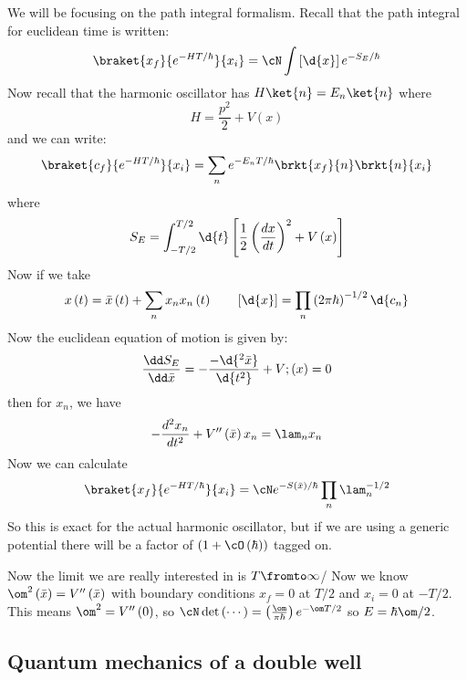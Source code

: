 \documentclass{booc}
\begin{document}
We will be focusing on the path integral formalism.
Recall that the path integral for euclidean time is written:
\begin{equation}
\braket{x_f}{e^{-HT /\hbar}}{x_i} = 
\cN \int \left[ \d{x} \right] e^{-S_E / \hbar}
\end{equation}
Now recall that the harmonic oscillator has
$H\ket {n} = E_n\ket{n}$ 
where
\begin{equation}
H = \frac{p^2}{2} + V\left( x \right) 
\end{equation}
and we can write:
\begin{equation}
\braket{c_f}{e^{-HT / \hbar}}{x_i} = \sum_n e^{-E_n T / \hbar} \brkt{x_f}{n} \brkt{n}{x_i}
\end{equation}
where
\begin{equation}
S_E = \int_{-T/2}^{T/2} \d{t} \left[ \frac{1}{2} \left( \frac{dx}{dt} \right)^2 + V\left( x \right) \right]
\end{equation}
Now if we take
\begin{equation}
x\left( t \right) = \bar x\left( t \right) + \sum_n x_n x_n\left( t \right)
\qquad
\left[ \d{x} \right] = \prod_n \left( 2\pi \hbar \right)^{-1/2} \d{c_n}
\end{equation}
Now the euclidean equation of motion is given by:
\begin{equation}
\frac{\dd S_E}{\dd\bar x} = 
-\frac{-\d{^2 \bar x}}{\d{t^2}} + V;\left( x \right) = 0
\end{equation}
then for $x_n$, we have
\begin{equation}
-\frac{d^2 x_n}{dt^2} + V''\left( \bar x \right) x_n = \lam_n x_n
\end{equation}
Now we can calculate
\begin{equation}
\braket{x_f}{e^{-HT / \hbar}}{x_i} = 
\cN e^{-S\left( \bar x \right)/\hbar}
\prod_n \lam_n^{-1/2}
\end{equation}
So this is exact for the actual harmonic oscillator, but if we are using a generic potential
there will be  a factor of $\left( 1 + \cO\left( \hbar \right) \right)$ tagged on.

Now the limit we are really interested in is $T\fromto \infty$/ 
Now we know $\om^2\left( \bar x \right) = V''\left( \bar x \right)$
with boundary conditions $x_f = 0$ at $T/2$ and $x_i = 0$ at $-T/2$. 
This means $\om^2 = V''\left( 0 \right)$, 
so $\cN \det \left( \cdots \right) = \left( \frac{\om}{\pi \hbar} \right)e^{-\om T/2}$
so $E = \hbar \om /2$.

\subsection{Quantum mechanics of a double well}
\end{document}
